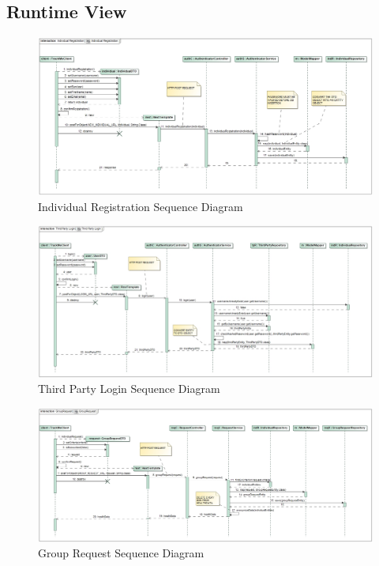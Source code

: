 \documentclass[a4paper]{article}
\begin{document}
\subsection{Runtime View}
\begin{figure}[!htpb]
    \centering
    \advance\leftskip-3cm
    \includegraphics[width=1.5\textwidth,keepaspectratio]{DD/images/UML/sequence_individualRegistration.jpg}
    \caption{Individual Registration Sequence Diagram}
    \label{fig:sequence_individualsignup}
\end{figure} 
\begin{figure}[!htpb]
    \centering
    \advance\leftskip-3cm
    \includegraphics[width=1.5\textwidth,keepaspectratio]{DD/images/UML/sequence_thirdPartyLogin.jpg}
    \caption{Third Party Login Sequence Diagram}
    \label{fig:sequence_tplogin}
\end{figure} 
\begin{figure}[!htpb]
    \centering
    \advance\leftskip-3cm
    \includegraphics[width=1.5\textwidth,keepaspectratio]{DD/images/UML/sequence_groupRequest.jpg}
    \caption{Group Request Sequence Diagram}
    \label{fig:sequence_grouprequest}
\end{figure}
\end{document}
